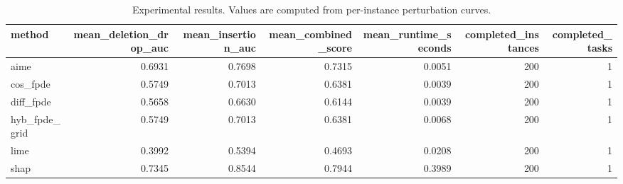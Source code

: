 \begin{table}[t]
\caption{Experimental results. Values are computed from per-instance perturbation curves.}
\label{tab:main_results_computed}
\centering
\begin{tabular}{lrrrrrr}
\toprule
method & mean\_deletion\_drop\_auc & mean\_insertion\_auc & mean\_combined\_score & mean\_runtime\_seconds & completed\_instances & completed\_tasks \\
\midrule
aime & 0.6931 & 0.7698 & 0.7315 & 0.0051 & 200 & 1 \\
cos\_fpde & 0.5749 & 0.7013 & 0.6381 & 0.0039 & 200 & 1 \\
diff\_fpde & 0.5658 & 0.6630 & 0.6144 & 0.0039 & 200 & 1 \\
hyb\_fpde\_grid & 0.5749 & 0.7013 & 0.6381 & 0.0068 & 200 & 1 \\
lime & 0.3992 & 0.5394 & 0.4693 & 0.0208 & 200 & 1 \\
shap & 0.7345 & 0.8544 & 0.7944 & 0.3989 & 200 & 1 \\
\bottomrule
\end{tabular}

\end{table}
